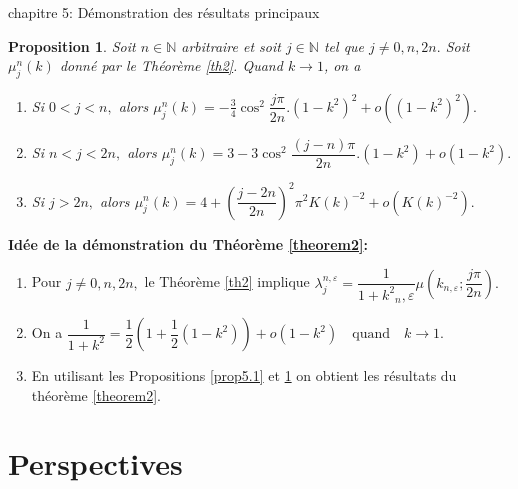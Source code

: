 \documentclass[mathserif,10pt]{beamer}
\newtheorem{proposition}{Proposition}
\begin{document}
\begin{frame}{chapitre 5: Démonstration des résultats principaux }\transglitter[duration=1]
\begin{exampleblock}{}
\begin{proposition}\label{pro15}
Soit $n\in \mathbb{N}$ arbitraire et soit $j \in \mathbb{N}$ tel que $j\neq 0,n,2n.$  Soit $\mu_{j}^{n}(k)$ donné par le Théorème \ref{th2}. Quand $ k\rightarrow 1$, on a 
\begin{enumerate}
\item Si $0<j<n,$ alors 
$
\mu_{j}^{n}(k)=-\frac{3}{4}\cos^{2}\dfrac{j\pi}{2n}.(1-k^{2})^{2}+o\left((1-k^{2})^{2}\right).
$
\item Si $n<j<2n,$ alors 
$
\mu_{j}^{n}(k)=3-3\cos^{2}\dfrac{(j-n)\pi}{2n}.(1-k^{2})+o(1-k^{2}).
$
\item Si $j>2n,$ alors 
$
\mu_{j}^{n}(k)=4+\left(\dfrac{j-2n}{2n}\right)^{2}\pi^{2}K(k)^{-2}+o\left(K(k)^{-2}\right).
$
\end{enumerate}
\end{proposition}
\end{exampleblock}\pause
\textbf{Idée de la démonstration du Théorème \ref{theorem2}: }\pause
\begin{enumerate}
\item Pour $j \neq 0,n,2n,$  le Théorème \ref{th2} implique
$
\lambda_{j}^{n,\varepsilon }=\dfrac{1}{1+k^{2}{_n,\varepsilon }}\mu \left(k_{n,\varepsilon };\dfrac{j\pi }{2n}\right).
$\pause
\item On a
$
\dfrac{1}{1+k^{2}}=\dfrac{1}{2}\left(1+\dfrac{1}{2}(1-k^{2})\right)+o(1-k^{2})\quad \mathrm{quand}\quad k \rightarrow 1.
$\pause
\item En utilisant les Propositions \ref{prop5.1} et \ref{pro15} on obtient les résultats du théorème \ref{theorem2}.
\end{enumerate}
\end{frame}  
\section{Perspectives}
\begin{frame}{}\transglitter[duration=1]
\begin{center}
\end{center}
\end{frame}
\end{document}
